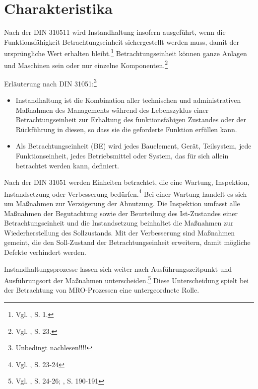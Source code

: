 \section{Charakteristika}

Nach der DIN 310511 wird Instandhaltung insofern ausgeführt, wenn die Funktionsfähigkeit Betrachtungseinheit sichergestellt werden muss, damit der ursprüngliche Wert erhalten bleibt.\footnote{Vgl. \cite{Strunz:2012aa}, S. 1.} Betrachtungseinheit können ganze Anlagen und Maschinen sein oder nur einzelne Komponenten.\footnote{Vgl. \cite{schenk2010techSys}, S. 23.}

Erläuterung nach DIN 31051:\footnote{Unbedingt nachlesen!!!!}
\begin{itemize}
\item Instandhaltung ist die Kombination aller technischen und administrativen Maßnahmen des Managements während des Lebenszyklus einer Betrachtungseinheit zur Erhaltung des funktionsfähigen Zustandes oder der Rückführung in diesen, so dass sie die geforderte Funktion erfüllen kann.
\item Als Betrachtungseinheit (BE) wird jedes Bauelement, Gerät, Teilsystem, jede Funktionseinheit, jedes Betriebsmittel oder System, das für sich allein betrachtet werden kann, definiert.
\end{itemize}

Nach der DIN 31051 werden Einheiten betrachtet, die eine Wartung, Inspektion, Instandsetzung oder Verbesserung bedürfen.\footnote{Vgl. \cite{schenk2010techSys}, S. 23-24} Bei einer Wartung handelt es sich um Maßnahmen zur Verzögerung der Abnutzung. Die Inspektion umfasst alle Maßnahmen der Begutachtung sowie der Beurteilung des Ist-Zustandes einer Betrachtungseinheit und die Instandsetzung beinhaltet die Maßnahmen zur Wiederherstellung des Sollzustands. Mit der Verbesserung sind Maßnahmen gemeint, die den Soll-Zustand der Betrachtungseinheit erweitern, damit mögliche Defekte verhindert werden.

Instandhaltungsprozesse lassen sich weiter nach Ausführungszeitpunkt und Ausführungsort der Maßnahmen unterscheiden.\footnote{Vgl. \cite{schenk2010techSys}, S. 24-26; \cite{hinsch2010instandhaltung}, S. 190-191} Diese Unterscheidung spielt bei der Betrachtung von MRO-Prozessen eine untergeordnete Rolle. 

